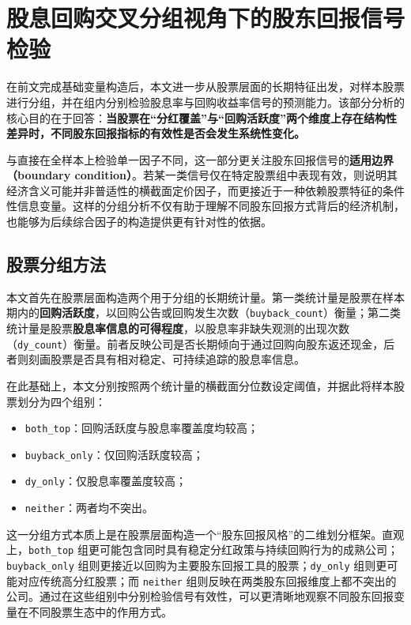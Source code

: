 \documentclass[a4paper,10pt]{article}
\begin{document}
\section{股息回购交叉分组视角下的股东回报信号检验}

在前文完成基础变量构造后，本文进一步从股票层面的长期特征出发，对样本股票进行分组，并在组内分别检验股息率与回购收益率信号的预测能力。该部分分析的核心目的在于回答：\textbf{当股票在“分红覆盖”与“回购活跃度”两个维度上存在结构性差异时，不同股东回报指标的有效性是否会发生系统性变化。}

与直接在全样本上检验单一因子不同，这一部分更关注股东回报信号的\textbf{适用边界（boundary condition）}。若某一类信号仅在特定股票组中表现有效，则说明其经济含义可能并非普适性的横截面定价因子，而更接近于一种依赖股票特征的条件性信息变量。这样的分组分析不仅有助于理解不同股东回报方式背后的经济机制，也能够为后续综合因子的构造提供更有针对性的依据。

\subsection{股票分组方法}

本文首先在股票层面构造两个用于分组的长期统计量。第一类统计量是股票在样本期内的\textbf{回购活跃度}，以回购公告或回购发生次数（\texttt{buyback\_count}）衡量；第二类统计量是股票\textbf{股息率信息的可得程度}，以股息率非缺失观测的出现次数（\texttt{dy\_count}）衡量。前者反映公司是否长期倾向于通过回购向股东返还现金，后者则刻画股票是否具有相对稳定、可持续追踪的股息率信息。

在此基础上，本文分别按照两个统计量的横截面分位数设定阈值，并据此将样本股票划分为四个组别：
\begin{itemize}
    \item \texttt{both\_top}：回购活跃度与股息率覆盖度均较高；
    \item \texttt{buyback\_only}：仅回购活跃度较高；
    \item \texttt{dy\_only}：仅股息率覆盖度较高；
    \item \texttt{neither}：两者均不突出。
\end{itemize}

这一分组方式本质上是在股票层面构造一个“股东回报风格”的二维划分框架。直观上，\texttt{both\_top} 组更可能包含同时具有稳定分红政策与持续回购行为的成熟公司；\texttt{buyback\_only} 组则更接近以回购为主要股东回报工具的股票；\texttt{dy\_only} 组则更可能对应传统高分红股票；而 \texttt{neither} 组则反映在两类股东回报维度上都不突出的公司。通过在这些组别中分别检验信号有效性，可以更清晰地观察不同股东回报变量在不同股票生态中的作用方式。
\end{document}

